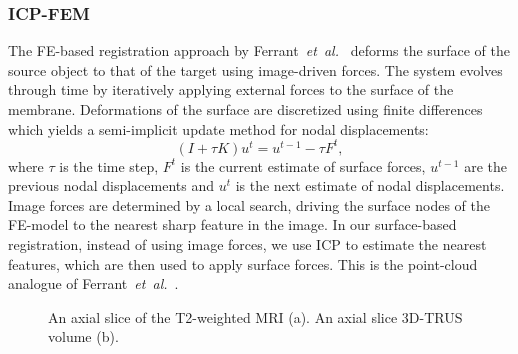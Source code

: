 \documentclass[journal]{IEEEtran}
\begin{document}
\subsubsection{ICP-FEM}\label{sec:icpfem}
The FE-based registration approach by Ferrant~\textit{et~al.}~\cite{Ferrant01a} deforms the surface of the source object to that of the target using image-driven forces. The system evolves through time by iteratively applying external forces to the surface of the membrane. Deformations of the surface are discretized using finite differences which yields a semi-implicit update method for nodal displacements:
\begin{equation}\label{eq:icpfem}
(I+\tau{K})u^t = u^{t-1} - \tau{F^t},
\end{equation}
where $\tau$ is the time step, $F^t$ is the current estimate of surface forces, $u^{t-1}$ are the previous nodal displacements and $u^t$ is the next estimate of nodal displacements. Image forces are determined by a local search, driving the surface nodes of the FE-model to the nearest sharp feature in the image.  In our surface-based registration, instead of using image forces, we use ICP to estimate the nearest features, which are then used to apply surface forces. This is the point-cloud analogue of Ferrant~\textit{et~al.}~\cite{Ferrant01a}.
\begin{figure}[t]\label{fig:biopsy}
	\centering
	 \hfill
	 \hfill
  \caption{An axial slice of the T2-weighted MRI (a). An axial slice 3D-TRUS volume (b).}
\end{figure}
\end{document}
